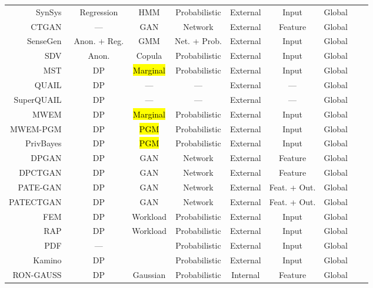 \documentclass[parskip=full]{scrartcl}
\begin{document}
\begin{longtable}{rcccccccc}
    \bottomrule
    \endlastfoot
    SynSys~\cite{dahmen2019synsys} & Regression & HMM & Probabilistic & External & Input & Global \\
    CTGAN~\cite{xu2019modeling} & --- & GAN & Network & External & Feature & Global \\
    SenseGen~\cite{alzantot2017sensegen} & Anon. + Reg. & GMM & Net. + Prob. & External & Input & Global \\
    SDV~\cite{patki2016synthetic} & Anon. & Copula & Probabilistic & External & Input & Global \\
    MST~\cite{mckenna2021winning} & DP & \hl{Marginal} & Probabilistic & External & Input & Global \\
    QUAIL~\cite{rosenblatt2020differentially} & DP & --- & --- & External & --- & Global \\
    SuperQUAIL~\cite{rosenblatt2022spending} & DP & --- & --- & External & --- & Global \\
    MWEM~\cite{hardt2012simple} & DP & \hl{Marginal} & Probabilistic & External & Input & Global \\
    MWEM-PGM~\cite{mckenna2019graphical} & DP & \hl{PGM} & Probabilistic & External & Input & Global \\
    PrivBayes~\cite{zhang2017privbayes} & DP & \hl{PGM} & Probabilistic & External & Input & Global \\
    DPGAN~\cite{xie2018differentially} & DP & GAN & Network & External & Feature & Global \\
    DPCTGAN~\cite{rosenblatt2020differentially} & DP & GAN &  Network & External & Feature & Global \\
    PATE-GAN~\cite{jordon2018pate} & DP & GAN & Network & External & Feat. + Out. & Global \\
    PATECTGAN~\cite{rosenblatt2020differentially} & DP & GAN & Network & External & Feat. + Out. & Global \\
    FEM~\cite{vietri2020new} & DP & Workload & Probabilistic & External & Input & Global \\
    RAP~\cite{aydore2021differentially} & DP & Workload & Probabilistic & External & Input & Global \\
    PDF~\cite{de2019formal, suciu2011probabilistic} & --- &  & Probabilistic & External & Input & Global \\
    Kamino~\cite{ge2021kamino} & DP  &  & Probabilistic & External & Input & Global \\
    RON-GAUSS~\cite{chanyaswad2019ron} & DP & Gaussian & Probabilistic & Internal & Feature & Global \\

\end{longtable}
\end{document}

